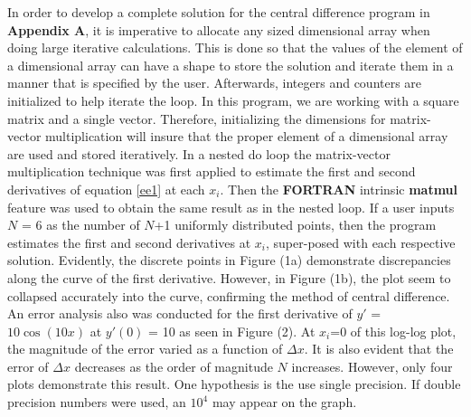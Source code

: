 \documentclass[12pt]{article}
\begin{document}
\begin{doublespace}
In order to develop a complete solution for the central difference program in {\bf Appendix A}, it is imperative to allocate any sized dimensional array when doing large iterative calculations. This is done so that the values of the element of a dimensional array can have a shape to store the solution and iterate them in a manner that is specified by the user. Afterwards, integers and counters are initialized to help iterate the loop. In this program, we are working with a square matrix and a single vector. Therefore, initializing the dimensions for matrix-vector multiplication will insure that the proper element of a dimensional array are used and stored iteratively. In a nested do loop the matrix-vector multiplication technique was first applied to estimate the first and second derivatives of equation \ref{ee1} at each $x_{i}$. Then the \textbf{FORTRAN} intrinsic \textbf{matmul} feature was used to obtain the same result as in the nested loop. If a user inputs $N$ = 6 as the number of $N$+1 uniformly distributed points, then the program estimates the first and second derivatives at $x_{i}$, super-posed with each respective solution. Evidently, the discrete points in Figure (1a) demonstrate discrepancies along the curve of the first derivative. However, in Figure (1b), the plot seem to collapsed accurately into the curve, confirming the method of central difference. An error analysis also was conducted for the first derivative of $y'$ = $10\cos(10x)$ at $y'(0)$ = 10 as seen in Figure (2). At $x_{i}$=0 of this log-log plot, the magnitude of the error varied as a function of $\Delta{x}$. It is also evident that the error of $\Delta{x}$ decreases as the order of magnitude $N$ increases. However, only four plots demonstrate this result. One hypothesis is the use single precision. If double precision numbers were used, an $10^{4}$ may appear on the graph.
\end{doublespace}

\newpage
\end{document}
